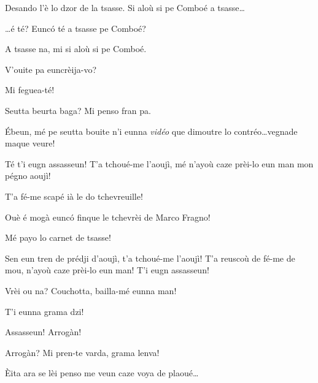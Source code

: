 \begin{drama}
\Tuenospeaks Desando l'è lo dzor de la tsasse. Si aloù si pe Comboé a tsasse\ldots

\Saventaspeaks{} \ldots é té? Eunc\'o té a tsasse pe Comboé?

\Richardspeaks A tsasse na, mi si aloù si pe Comboé.

\Saventaspeaks V'ouite pa euncrèija-vo?

\Richardspeaks Mi feguea-té!

\Tuenospeaks{} Seutta beurta baga? Mi penso fran pa.

\Saventaspeaks \'Ebeun, mé pe seutta bouite  n'i eunna \textit{vidéo} que dimoutre lo contréo\ldots vegnade maque veure! 





\Richardspeaks Té t'i eugn assasseun! T'a tchoué-me l'aoujì, mé n'ayoù caze prèi-lo eun man mon pégno aoujì!

\Tuenospeaks T'a fé-me scapé ià le do tchevreuille!

\Richardspeaks Ouè é mogà eunc\'o finque le tchevrèi de Marco Fragno!

\Tuenospeaks Mé payo lo carnet de tsasse!

\Richardspeaks Sen eun tren de prédji d'aoujì, t'a tchoué-me l'aoujì! T'a reuscoù de fé-me de mou, n'ayoù caze prèi-lo eun man! T'i eugn assasseun!

\Richardspeaks{} Vrèi ou na? Couchotta, bailla-mé eunna man!

\Gerominespeaks{} T'i eunna grama dzi!

\Richardspeaks Assasseun! Arrogàn!


\Tuenospeaks Arrogàn? Mi pren-te varda, grama lenva!

\Richardspeaks \`Eita ara se lèi penso me veun caze voya de plaoué\ldots


\end{drama}
